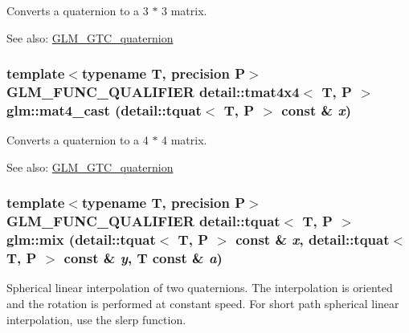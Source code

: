 Converts a quaternion to a 3 $\ast$ 3 matrix.

\begin{Desc}
\item[See also:]\hyperlink{group__gtc__quaternion}{GLM\_\-GTC\_\-quaternion} \end{Desc}
\hypertarget{group__gtc__quaternion_gbe87795cddd91732acb07830f8125a2d}{
\subsubsection[mat4\_\-cast]{\setlength{\rightskip}{0pt plus 5cm}template$<$typename T, precision P$>$ GLM\_\-FUNC\_\-QUALIFIER detail::tmat4x4$<$ T, P $>$ glm::mat4\_\-cast (detail::tquat$<$ T, P $>$ const \& {\em x})}}
\label{group__gtc__quaternion_gbe87795cddd91732acb07830f8125a2d}


Converts a quaternion to a 4 $\ast$ 4 matrix.

\begin{Desc}
\item[See also:]\hyperlink{group__gtc__quaternion}{GLM\_\-GTC\_\-quaternion} \end{Desc}
\hypertarget{group__gtc__quaternion_gd53916e67eedc8bb259548504b713350}{
\subsubsection[mix]{\setlength{\rightskip}{0pt plus 5cm}template$<$typename T, precision P$>$ GLM\_\-FUNC\_\-QUALIFIER detail::tquat$<$ T, P $>$ glm::mix (detail::tquat$<$ T, P $>$ const \& {\em x}, \/  detail::tquat$<$ T, P $>$ const \& {\em y}, \/  T const \& {\em a})}}
\label{group__gtc__quaternion_gd53916e67eedc8bb259548504b713350}


Spherical linear interpolation of two quaternions. The interpolation is oriented and the rotation is performed at constant speed. For short path spherical linear interpolation, use the slerp function.

